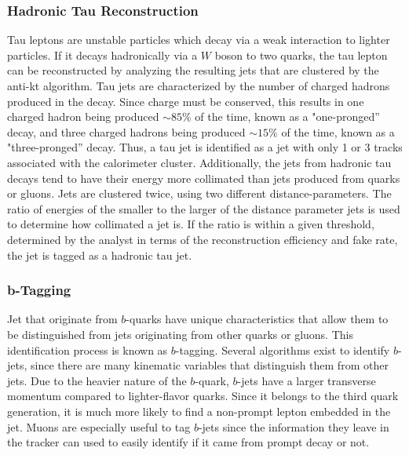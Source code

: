 \subsubsection{Hadronic Tau Reconstruction}
\label{tau_reco_overview}

\par Tau leptons are unstable particles which decay via a weak
interaction to lighter particles.  If it decays hadronically via a $W$
boson to two quarks, the tau lepton can be reconstructed by analyzing the
resulting jets that are clustered by the anti-kt algorithm.  Tau jets
are characterized by the number of charged hadrons produced in the
decay.  Since charge must be conserved, this results in one charged
hadron being produced $\sim85\%$ of the time, known as a
"one-pronged'' decay, and three charged hadrons being produced
$\sim15\%$ of the time, known as a "three-pronged'' decay.  Thus, a
tau jet is identified as a jet with only 1 or 3 tracks associated with
the calorimeter cluster.  Additionally, the jets from hadronic tau
decays tend to have their energy more collimated than jets produced
from quarks or gluons.  Jets are clustered twice, using two different
distance-parameters.  The ratio of energies of the smaller to the larger of the
distance parameter jets is used to determine how collimated a jet is.
If the ratio is within a given threshold, determined by the analyst in
terms of the reconstruction efficiency and fake rate, the jet is
tagged as a hadronic tau jet. 

\subsubsection{b-Tagging}
\label{b_tagging_overview}

\par Jet that originate from $b$-quarks have unique characteristics
that allow them to be distinguished from jets originating from other
quarks or gluons. This identification process is known as
$b$-tagging.  Several algorithms exist to identify $b$-jets, since
there are many kinematic variables that distinguish them from other
jets.  Due to the heavier nature of the $b$-quark, $b$-jets have
a larger transverse momentum compared to lighter-flavor quarks.
Since it belongs to the third quark generation, it is much more likely
to find a non-prompt lepton embedded in the jet.  Muons are especially
useful to tag $b$-jets since the information they leave in the tracker
can used to easily identify if it came from prompt decay or not.  

